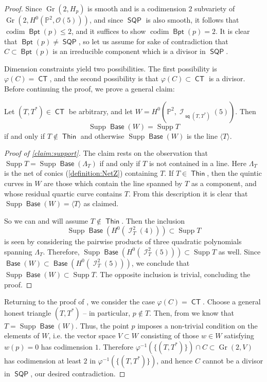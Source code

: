\documentclass{article}
\renewcommand{\P}{\mathbb{P}}
\DeclareMathOperator{\I}{\mathcal{I}}
\renewcommand{\O}{\mathcal{O}}
\DeclareMathOperator{\CT}{\mathsf{CT}}
\DeclareMathOperator{\Thin}{\mathsf{Thin}}
\DeclareMathOperator{\SQP}{\mathsf{SQP}}
\DeclareMathOperator{\Gr}{Gr}
\DeclareMathOperator{\s}{\mathsf{sq}}
\DeclareMathOperator{\BP}{\mathsf{Bpt}}
\DeclareMathOperator{\Base}{\mathsf{Base}}
\DeclareMathOperator{\codim}{codim}
\DeclareMathOperator{\Supp}{Supp}
\begin{document}
\begin{proof}
    Since $\Gr(2,H_{p})$ is smooth and is a codimension $2$ subvariety of $\Gr\left(2, H^{0}(\P^{2}, \O(5))\right)$, and since $\SQP$ is also smooth, it follows that $\codim \BP(p) \leq 2$, and it suffices to show $\codim \BP(p) = 2$. It is clear that $\BP (p) \neq \SQP$, so let us assume for sake of contradiction that $C \subset \BP(p)$ is an irreducible component which is a divisor in $\SQP$.  

    Dimension constraints yield two possibilities. The first possibility is $\varphi(C) = \CT$, and the second possibility is that $\varphi(C) \subset \CT$ is a divisor.  Before continuing the proof, we prove a general claim:  
    \begin{lemma}
    \label{claim:support}
    Let $(T,T^{*}) \in \CT$ be arbitrary, and let $W = H^{0}(\P^{2}, \I_{\s(T,T^{*})}(5))$.  Then \[\Supp \Base(W) = \Supp T\] if and only if $T \notin \Thin$ and otherwise $\Supp \Base(W)$ is the line $\langle T \rangle$.
    \end{lemma}
    \begin{proof}[Proof of \ref{claim:support}]
    The claim rests on the observation that $\Supp T = \Supp \Base (\Lambda_{T})$ if and only if $T$ is not contained in a line. Here $\Lambda_{T}$ is the net of conics (\autoref{definition:NetZ}) containing $T$.  If $T \in \Thin$, then the quintic curves in $W$ are those which contain the line spanned by $T$ as a component, and whose residual quartic curve contains $T$.  From this description it is clear that $\Supp\Base(W) = \langle T \rangle$ as claimed.  
    
    So we can and will assume $T \notin \Thin$. Then the inclusion $$\Supp \Base (H^{0}(\I_{T}^{2}(4))) \subset \Supp T$$ is seen by considering the pairwise products of  three quadratic polynomials spanning $\Lambda_{T}$.  Therefore, $\Supp \Base (H^{0}(\I_{T}^{2}(5))) \subset \Supp T$ as well. Since $\Base (W) \subset \Base (H^{0}(\I_{T}^{2}(5)))$, we conclude that $\Supp \Base (W) \subset \Supp T$. The opposite inclusion is trivial, concluding the proof. 
    \end{proof}

    Returning to the proof of , we consider the case $\varphi(C) = \CT$.  Choose a general honest triangle $(T,T^{*})$ -- in particular, $p \notin T$.  Then, from  we know that $T = \Supp \Base(W)$.  Thus, the point $p$ imposes a non-trivial condition on the elements of $W$, i.e. the vector space $V \subset W$ consisting of those $w \in W$ satisfying $w(p)=0$ has codimension $1$.  Therefore $\varphi^{-1}(\{(T, T^{*})\}) \cap C \subset \Gr(2,V)$ has codimension at least $2$ in $\varphi^{-1}(\{(T, T^{*})\})$, and hence $C$ cannot be a divisor in $\SQP$, our desired contradiction.  


\end{proof}
\end{document}
